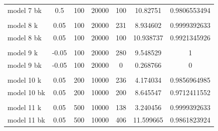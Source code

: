 \documentclass[submit]{harvardml}
\begin{document}
\begin{table}[htb]
\begin{tabular}{lcccccc}
		model 7 bk                           & {\color[HTML]{3166FF} 0.5}   & 100                        & 20000                        & 100                         & 10.82751              & 0.9806553494         \\
		&                              &                            &                              &                             &                       &                      \\
		model 8 k                            & {\color[HTML]{3166FF} 0.05}  & 100                        & 20000                        & 231                         & 8.934602              & 0.9999392633         \\
		model 8 bk                           & {\color[HTML]{3166FF} 0.05}  & 100                        & 20000                        & 100                         & 10.938737             & 0.9921345926         \\
		&                              &                            &                              &                             &                       &                      \\
		model 9 k                            & {\color[HTML]{3166FF} -0.05} & 100                        & 20000                        & 280                         & 9.548529              & 1                    \\
		model 9 bk                           & {\color[HTML]{3166FF} -0.05} & 100                        & 20000                        & 0                           & 0.268766              & 0                    \\
		&                              &                            &                              &                             &                       &                      \\
		model 10 k                           & {\color[HTML]{3166FF} 0.05}  & {\color[HTML]{3166FF} 200} & {\color[HTML]{3166FF} 10000} & 236                         & 4.174034              & 0.9856964985         \\
		model 10 bk                          & {\color[HTML]{3166FF} 0.05}  & {\color[HTML]{3166FF} 200} & {\color[HTML]{3166FF} 10000} & 200                         & 8.645547              & 0.9712411552         \\
		&                              &                            &                              &                             &                       &                      \\
		model 11 k                           & {\color[HTML]{3166FF} 0.05}  & {\color[HTML]{3166FF} 500} & {\color[HTML]{3166FF} 10000} & 138                         & 3.240456              & 0.9999392633         \\
		model 11 bk                          & {\color[HTML]{3166FF} 0.05}  & {\color[HTML]{3166FF} 500} & {\color[HTML]{3166FF} 10000} & 406                         & 11.599665             & 0.9861823924        
	\end{tabular}
\end{table}
\end{document}
